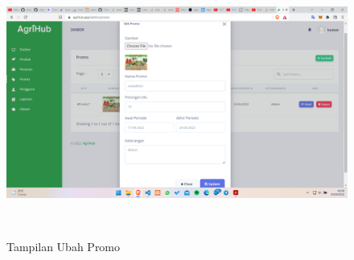 \begin{enumerate}
\begin{enumerate}[a.]
\begin{figure}[H]
			{\includegraphics [width = 13.3cm, height= 8cm]{gambar/admin/ubah_promo}}
			\caption{Tampilan Ubah Promo}
			\label{ubah_promo}
		\end{figure}


\end{enumerate}
\end{enumerate}
